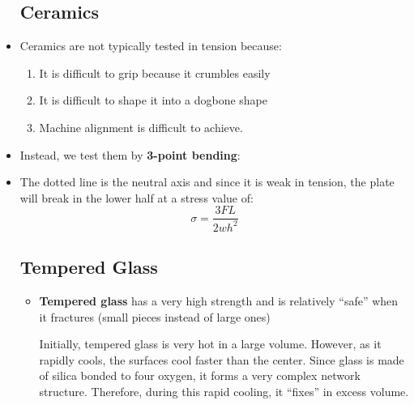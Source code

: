 \begin{itemize}
    \subsection{Ceramics}
    \item Ceramics are not typically tested in tension because:
    \begin{enumerate}
        \item It is difficult to grip because it crumbles easily
        \item It is difficult to shape it into a dogbone shape
        \item Machine alignment is difficult to achieve.
    \end{enumerate}
    \item Instead, we test them by \textbf{3-point bending}:
    \begin{figure}[ht]
        \centering
    \end{figure}
    \item The dotted line is the neutral axis and since it is weak in tension, the plate will break in the lower half at a stress value of:
    \begin{equation}
        \sigma = \frac{3FL}{2wh^2}
    \end{equation}
    \subsection{Tempered Glass}
    \begin{itemize}
        \item \textbf{Tempered glass} has a very high strength and is relatively ``safe'' when it fractures (small pieces instead of large ones)
        \begin{idea}
            Initially, tempered glass is very hot in a large volume. However, as it rapidly cools, the surfaces cool faster than the center. Since glass is made of silica bonded to four oxygen, it forms a very complex network structure. Therefore, during this rapid cooling, it ``fixes'' in excess volume.
            \vspace{2mm}
            

\end{idea}
\end{itemize}
\end{itemize}
